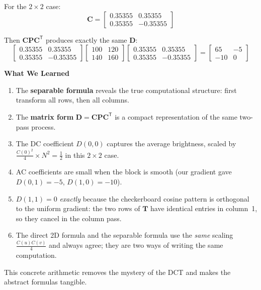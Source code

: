 \begin{examplebox}
For the $2\times2$ case:
\[
\mathbf{C} = \begin{bmatrix}
0.35355 & 0.35355 \\
0.35355 & -0.35355
\end{bmatrix}
\]

Then $\mathbf{C}\mathbf{P}\mathbf{C}^{\mathsf{T}}$ produces exactly the same $\mathbf{D}$:
\[
\begin{bmatrix}
0.35355 & 0.35355 \\
0.35355 & -0.35355
\end{bmatrix}
\begin{bmatrix}
100 & 120 \\
140 & 160
\end{bmatrix}
\begin{bmatrix}
0.35355 & 0.35355 \\
0.35355 & -0.35355
\end{bmatrix}
=
\begin{bmatrix}
65 & -5 \\
-10 & 0
\end{bmatrix}
\]

\medskip
\noindent
\textbf{\large What We Learned}

\begin{enumerate}[nosep]
    \item The \textbf{separable formula} reveals the true computational structure:
          first transform all rows, then all columns.
    \item The \textbf{matrix form} $\mathbf{D} = \mathbf{C}\mathbf{P}\mathbf{C}^{\mathsf{T}}$
          is a compact representation of the same two-pass process.
    \item The DC coefficient $D(0,0)$ captures the average brightness, scaled by
          $\frac{C(0)^2}{4} \times N^2 = \frac{1}{2}$ in this $2\times2$ case.
    \item AC coefficients are small when the block is smooth (our gradient gave
          $D(0,1)=-5$, $D(1,0)=-10$).
    \item $D(1,1)=0$ \emph{exactly} because the checkerboard cosine pattern
          is orthogonal to the uniform gradient: the two rows of $\mathbf{T}$
          have identical entries in column~1, so they cancel in the column pass.
    \item The direct 2D formula and the separable formula use the \emph{same}
          scaling $\frac{C(u)C(v)}{4}$ and always agree; they are two ways
          of writing the same computation.
\end{enumerate}

\begin{center}
\end{center}

This concrete arithmetic removes the mystery of the DCT and makes the abstract
formulas tangible.
\end{examplebox}


